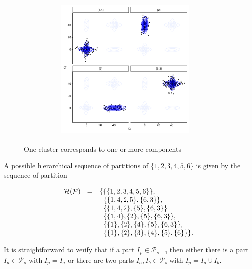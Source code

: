 \documentclass[10pt, a4paper]{article}
\begin{document}
\begin{spacing}{1.9}
\begin{figure}[h]
\begin{center}
\begin{tabular}{cc}
  \includegraphics[width=0.65\textwidth]{figures/partition-example-part4.pdf} \\
 \end{tabular}
 \caption{One cluster corresponds to one or more components}\label{ex_two_one}
\end{center}
\end{figure}


A possible hierarchical sequence of partitions of $\{1, 2, 3, 4, 5, 6\}$ is given by the sequence of partition

\begin{equation}
\begin{array}{r c l}
\mathcal{H}(\mathcal{P}) &=& \{ \{\{1, 2, 3, 4, 5, 6\}\}, \\
   & & \;\; \{ \{1, 4, 2, 5\}, \{6, 3\} \},  \\
    & & \;\; \{ \{1, 4, 2\}, \{5\}, \{6, 3\} \}, \\
   & & \;\; \{ \{1, 4\},\{2\}, \{5\}, \{6, 3\} \}, \\
   & & \;\;  \{\{1\},\{2\},\{4\},\{5\},\{6,3\} \},\\
   & &  \;\;  \{\{1\},\{2\},\{3\},\{4\},\{5\},\{6\}\} \}.
\end{array}
\label{hier_ex}
\end{equation}

It is straightforward to verify that if a part $I_p \in \mathcal{P}_{s-1}$ then either there is a part $I_a \in \mathcal{P}_{s}$ with $I_p = I_a$ or there are two parts $I_a, I_b \in \mathcal{P}_s$ with $I_p = I_a \cup I_b$.



\end{spacing}
\end{document}
